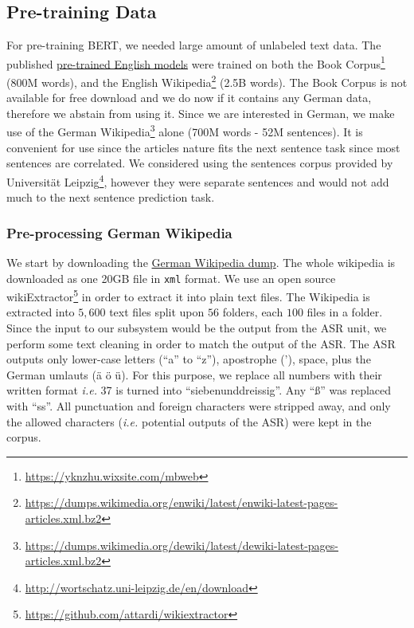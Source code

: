 \subsection{Pre-training Data}
\label{meth:s5_sub3}

For pre-training \ac{BERT}, we needed large amount of unlabeled text data. The published \href{https://github.com/google-research/bert#pre-trained-models}{pre-trained English models} were trained on both the Book Corpus\footnote{\url{https://yknzhu.wixsite.com/mbweb}} (800M words), and the English Wikipedia\footnote{\url{https://dumps.wikimedia.org/enwiki/latest/enwiki-latest-pages-articles.xml.bz2}} (2.5B words). The Book Corpus is not available for free download and we do now if it contains any German data, therefore we abstain from using it. Since we are interested in German, we make use of the German Wikipedia\footnote{\url{https://dumps.wikimedia.org/dewiki/latest/dewiki-latest-pages-articles.xml.bz2}} alone (700M words - 52M sentences). It is convenient for use since the articles nature fits the next sentence task since most sentences are correlated. We considered using the sentences corpus provided by Universit{\"a}t Leipzig\footnote{\url{http://wortschatz.uni-leipzig.de/en/download}}, however they were separate sentences and would not add much to the next sentence prediction task. 

\subsubsection{Pre-processing German Wikipedia}
\label{meth:s5_sub3_subsub1}
We start by downloading the \href{https://dumps.wikimedia.org/dewiki/latest/dewiki-latest-pages-articles.xml.bz2}{German Wikipedia dump}. The whole wikipedia is downloaded as one 20GB file in \texttt{xml} format. We use an open source wikiExtractor\footnote{\url{https://github.com/attardi/wikiextractor}} in order to extract it into plain text files. The Wikipedia is extracted into $5,600$ text files split upon $56$ folders, each $100$ files in a folder. Since the input to our subsystem would be the output from the \ac{ASR} unit, we perform some text cleaning in order to match the output of the \ac{ASR}. The \ac{ASR} outputs only lower-case letters (\enquote{a} to \enquote{z}), apostrophe ('), space, plus the German umlauts ({\"a} {\"o} {\"u}). For this purpose, we replace all numbers with their written format \textit{i.e.} 37 is turned into \enquote{siebenunddreissig}. Any \enquote{\ss} was replaced with \enquote{ss}. All punctuation and foreign characters were stripped away, and only the allowed characters (\textit{i.e.} potential outputs of the \ac{ASR}) were kept in the corpus.


